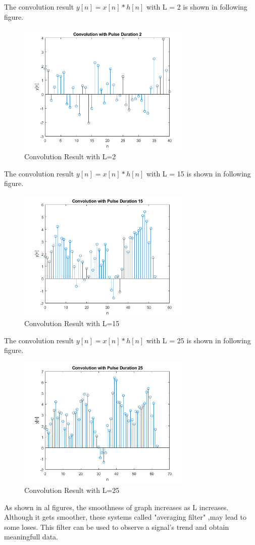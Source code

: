 \documentclass[letterpaper,12pt]{article}
\begin{document}
The convolution result \(y[n] = x[n] * h[n]\) with L = 2 is shown in following figure.
\begin{figure}[H]
    \centering
    \includegraphics[width = 0.75\textwidth]{b_duration2.png}
    \caption{Convolution Result with L=2}
    \end{figure} 


    The convolution result \(y[n] = x[n] * h[n]\) with L = 15 is shown in following figure.
    \begin{figure}[H]
        \centering
        \includegraphics[width = 0.75\textwidth]{b_duration15.png}
        \caption{Convolution Result with L=15}
        \end{figure} 

        
        The convolution result \(y[n] = x[n] * h[n]\) with L = 25 is shown in following figure. 
        \begin{figure}[H]
            \centering
            \includegraphics[width = 0.75\textwidth]{b_duration25.png}
            \caption{Convolution Result with L=25}
            \end{figure} 



As shown in al figures, the smoothness of graph increases as L increases. Although it gets smoother, these systems called "averaging filter" ,may lead to some loses. This filter can be used to observe a signal's trend and obtain meaningfull data.
\end{document}
